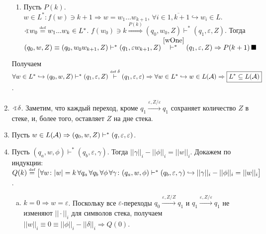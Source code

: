 \documentclass[a4paper]{article}
\def\A{{\cal A}}
\def\eqdef{\overset{\mbox{\tiny def}}{=}}
\begin{document}
\begin{enumerate}
\begin{enumerate}
\item 
Пусть $P(k)$. $w\in L^*\colon f(w)\ni k+1\Rightarrow w=w_1...w_{k+1},\,\forall i\in\overline{1,k+1}\hookrightarrow w_i\in L$. $\varangle w_0\eqdef w_1...w_k\in L^*$. $f(w_0)\ni k\overset{P(k)}{\Rightarrow} (q_0,w_0,Z)\vdash^*(q_1,\varepsilon,Z)$. Тогда $(q_0,w,Z)\equiv(q_0,w_0w_{k+1},Z)\vdash^*(q_1,\varepsilon w_{k+1},Z)\overset{\ref{wOne}}{\vdash^*}(q_1,\varepsilon,Z)\Rightarrow P(k+1)\,\blacksquare$
\end{enumerate}
Получаем $\forall w\in L^*\hookrightarrow (q_0,w,Z)\vdash^*(q_1,\varepsilon,Z)\overset{\mbox{\tiny def }\delta}{\vdash}(q_1,\varepsilon,\varepsilon)\Rightarrow \forall w\in L^*\hookrightarrow w\in L(\A)\Rightarrow \boxed{L^*\subseteq L(\A)}$.
\item \label{bottom} $\varangle\delta$. Заметим, что каждый переход, кроме $q_1\overset{\varepsilon
,Z/\varepsilon}{\longrightarrow}q_1$ сохраняет количество $Z$ в стеке, и, более того, оставляет $Z$ на
дне стека.
\item Пусть $w\in L(\A)\Rightarrow(q_0,w,Z)\vdash^*(q,\varepsilon,\varepsilon)$.
\item Пусть $(q_a,w,\phi)\vdash^*(q_b,\varepsilon,\gamma)$. Тогда $||\gamma||_i-||\phi||_i=||w||_i$. Докажем по индукции:\newline
$Q(k)\eqdef\big[\forall w\colon |w|=k\,\forall q_a\,\forall q_b\,\forall\phi\,\forall\gamma\colon (q_a,w,\phi)\vdash^*(q_b,\varepsilon,\gamma)\hookrightarrow ||\gamma||_i-||\phi||_i=||w||_i\big]$.\begin{enumerate}[a.]
\item $k=0\Rightarrow w=\varepsilon$. Поскольку все $\varepsilon$-переходы $q_0\overset{\varepsilon,Z/Z}{\longrightarrow}q_1$ и $q_1\overset{\varepsilon,Z/\varepsilon}{\longrightarrow}q_1$ не изменяют $||\cdot||_i$ для символов стека, получаем $||w||_i\equiv 0\equiv ||\phi||_i-||\delta||_i\Rightarrow Q(0)$.

\end{enumerate}
\end{enumerate}
\end{document}
